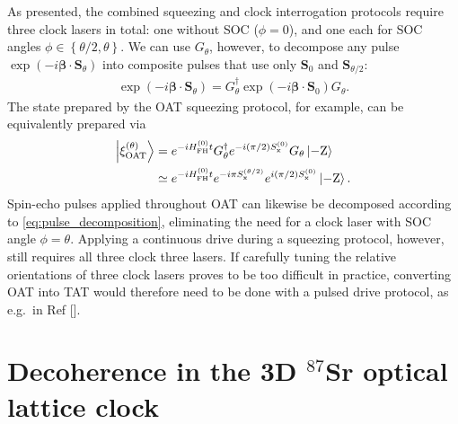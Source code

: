 \documentclass[aps,prx,superscriptaddress,twocolumn]{revtex4-2}
\renewcommand{\t}{\text} %
\newcommand{\p}[1]{\left(#1\right)} %
\renewcommand{\set}[1]{\left\{#1\right\}} %
\renewcommand{\c}{\cdot} %
\renewcommand{\v}{\bm} %
\renewcommand{\ket}{\Ket}
\newcommand{\x}{\text{x}}
\begin{document}
As presented, the combined squeezing and clock interrogation protocols require three clock lasers in total: one without SOC ($\phi=0$), and one each for SOC angles $\phi\in\set{\theta/2,\theta}$.
We can use $G_\theta$, however, to decompose any pulse $\exp\p{-i\v\beta\c\v S_\theta}$ into composite pulses that use only $\v S_0$ and $\v S_{\theta/2}$:
\begin{align}
  \exp\p{-i\v\beta\c\v S_\theta}
  = G_\theta^\dag \exp\p{-i\v\beta\c\v S_0} G_\theta.
  \label{eq:pulse_decomposition}
\end{align}
The state prepared by the OAT squeezing protocol, for example, can be equivalently prepared via
\begin{align}
  \ket{\xi_{\t{OAT}}^{(\theta)}}
  &= e^{-i H_{\t{FH}}^{(0)}t} G_\theta^\dag
  e^{-i\p{\pi/2}S_\x^{(0)}} G_\theta \ket{-\t{Z}} \notag \\
  &\simeq e^{-i H_{\t{FH}}^{(0)}t} e^{-i\pi S_\x^{(\theta/2)}}
  e^{i\p{\pi/2} S_\x^{(0)}} \ket{-\t{Z}}.
\end{align}
Spin-echo pulses applied throughout OAT can likewise be decomposed according to \eqref{eq:pulse_decomposition}, eliminating the need for a clock laser with SOC angle $\phi=\theta$.
Applying a continuous drive during a squeezing protocol, however, still requires all three clock three lasers.
If carefully tuning the relative orientations of three clock lasers proves to be too difficult in practice, converting OAT into TAT would therefore need to be done with a pulsed drive protocol, as e.g.~in Ref [].


\section{Decoherence in the 3D $^{87}$Sr optical lattice clock}
\label{sec:decoherence}
\end{document}
